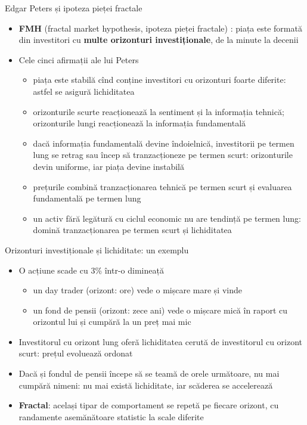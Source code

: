 \begin{frame}{Edgar Peters și ipoteza pieței fractale}
\itemsize{\footnotesize}
\begin{itemize}
    \item \textbf{FMH} (fractal market hypothesis, ipoteza pieței fractale) : piața este formată din investitori cu \textbf{multe orizonturi investiționale}, de la minute la decenii
    \item Cele cinci afirmații ale lui Peters
    \begin{itemize}
        \item piața este stabilă cînd conține investitori cu orizonturi foarte diferite: astfel se asigură lichiditatea
        \item orizonturile scurte reacționează la sentiment și la informația tehnică; orizonturile lungi reacționează la informația fundamentală
        \item dacă informația fundamentală devine îndoielnică, investitorii pe termen lung se retrag sau încep să tranzacționeze pe termen scurt: orizonturile devin uniforme, iar piața devine instabilă
        \item prețurile combină tranzacționarea tehnică pe termen scurt și evaluarea fundamentală pe termen lung
        \item un activ fără legătură cu ciclul economic nu are tendință pe termen lung: domină tranzacționarea pe termen scurt și lichiditatea
    \end{itemize}
\end{itemize}
\end{frame}

\begin{frame}{Orizonturi investiționale și lichiditate: un exemplu}
\itemsize{\small}
\begin{itemize}
    \item O acțiune scade cu 3\% într-o dimineață
    \begin{itemize}
        \item un day trader (orizont: ore) vede o mișcare mare și vinde
        \item un fond de pensii (orizont: zece ani) vede o mișcare mică în raport cu orizontul lui și cumpără la un preț mai mic
    \end{itemize}
    \item Investitorul cu orizont lung oferă lichiditatea cerută de investitorul cu orizont scurt: prețul evoluează ordonat
    \item Dacă și fondul de pensii începe să se teamă de orele următoare, nu mai cumpără nimeni: nu mai există lichiditate, iar scăderea se accelerează
    \item \textbf{Fractal}: același tipar de comportament se repetă pe fiecare orizont, cu randamente asemănătoare statistic la scale diferite
\end{itemize}
\end{frame}

